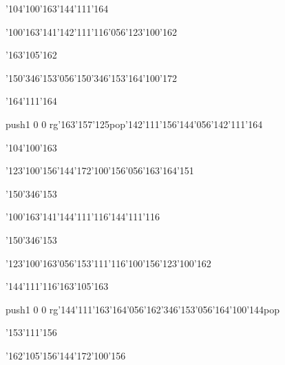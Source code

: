 \null\vfill\ipa\centerline{\enskip\char'104\char'100\char'163\enskip\enskip\enskip\enskip\char'144\char'111\char'164}\medskip\centerline{\enskip\char'100\char'163\enskip\char'141\enskip\char'142\char'111\char'116\char'056\char'123\char'100\char'162\enskip\enskip\enskip\enskip\enskip\enskip\enskip\enskip}\medskip\centerline{\enskip\enskip\enskip\enskip\enskip\enskip\enskip\enskip\enskip\enskip\enskip\enskip\enskip\enskip\char'163\char'105\char'162}\medskip\centerline{\enskip\char'150\char'346\char'153\char'056\char'150\char'346\char'153\enskip\enskip\enskip\enskip\enskip\enskip\char'164\char'100\char'172}\medskip\centerline{\enskip\enskip\enskip\enskip\enskip\enskip\enskip\enskip\enskip\enskip\enskip\char'164\char'111\char'164}\medskip\centerline{\enskip\pdfcolorstack\match push{1 0 0 rg}\char'163\char'157\char'125\pdfcolorstack\match pop{}\enskip\char'142\char'111\char'156\char'144\char'056\char'142\char'111\char'164\enskip\enskip\enskip\enskip}\medskip\centerline{\enskip\enskip\enskip\enskip\enskip\enskip\enskip\char'104\char'100\char'163\enskip\enskip\enskip\enskip}\medskip\centerline{\enskip\enskip\enskip\enskip\enskip\char'123\char'100\char'156\char'144\char'172\enskip\enskip\enskip\enskip\char'100\char'156\char'056\char'163\char'164\char'151}\medskip\vfill\footline{\hfil\tt\folio\hfil}\eject
\null\vfill\ipa\centerline{\enskip\enskip\enskip\enskip\enskip\enskip\enskip\char'150\char'346\char'153}\medskip\centerline{\enskip\char'100\char'163\enskip\char'141\enskip\enskip\enskip\enskip\char'144\char'111\char'116\enskip\enskip\enskip\enskip\enskip\char'144\char'111\char'116}\medskip\centerline{\enskip\enskip\enskip\enskip\enskip\enskip\enskip\enskip\enskip\enskip\enskip\enskip\enskip\enskip\char'150\char'346\char'153}\medskip\centerline{\enskip\char'123\char'100\char'163\char'056\char'153\char'111\char'116\enskip\char'100\char'156\enskip\enskip\enskip\char'123\char'100\char'162}\medskip\centerline{\enskip\enskip\enskip\enskip\enskip\enskip\enskip\char'144\char'111\char'116\enskip\char'163\char'105\char'163}\medskip\centerline{\enskip\enskip\enskip\enskip\enskip\pdfcolorstack\match push{1 0 0 rg}\char'144\char'111\char'163\char'164\char'056\char'162\char'346\char'153\char'056\char'164\char'100\char'144\pdfcolorstack\match pop{}}\medskip\centerline{\enskip\enskip\enskip\enskip\enskip\enskip\enskip\enskip\enskip\enskip\enskip\char'153\char'111\char'156}\medskip\centerline{\enskip\enskip\enskip\enskip\enskip\char'162\char'105\char'156\char'144\char'172\enskip\enskip\enskip\enskip\char'100\char'156\enskip\enskip\enskip\enskip}\medskip\vfill\footline{\hfil\tt\folio\hfil}\eject
